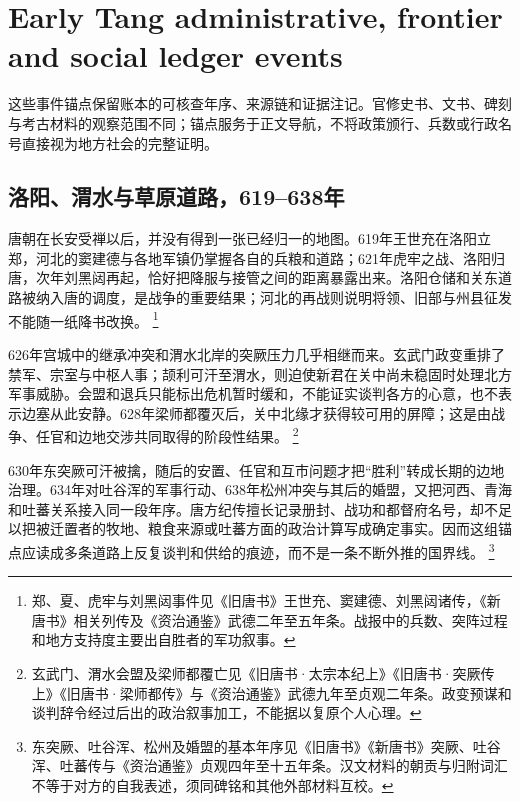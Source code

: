 \section{Early Tang administrative, frontier and social ledger events}
\label{sec:tang-event-anchors-batch-two}
这些事件锚点保留账本的可核查年序、来源链和证据注记。官修史书、文书、碑刻与考古材料的观察范围不同；锚点服务于正文导航，不将政策颁行、兵数或行政名号直接视为地方社会的完整证明。

\subsection{洛阳、渭水与草原道路，619--638年}

唐朝在长安受禅以后，并没有得到一张已经归一的地图。619年王世充在洛阳立郑，河北的窦建德与各地军镇仍掌握各自的兵粮和道路；621年虎牢之战、洛阳归唐，次年刘黑闼再起，恰好把降服与接管之间的距离暴露出来。洛阳仓储和关东道路被纳入唐的调度，是战争的重要结果；河北的再战则说明将领、旧部与州县征发不能随一纸降书改换。%
\footnote{郑、夏、虎牢与刘黑闼事件见《旧唐书》王世充、窦建德、刘黑闼诸传，《新唐书》相关列传及《资治通鉴》武德二年至五年条。战报中的兵数、突阵过程和地方支持度主要出自胜者的军功叙事。}

626年宫城中的继承冲突和渭水北岸的突厥压力几乎相继而来。玄武门政变重排了禁军、宗室与中枢人事；颉利可汗至渭水，则迫使新君在关中尚未稳固时处理北方军事威胁。会盟和退兵只能标出危机暂时缓和，不能证实谈判各方的心意，也不表示边塞从此安静。628年梁师都覆灭后，关中北缘才获得较可用的屏障；这是由战争、任官和边地交涉共同取得的阶段性结果。%
\footnote{玄武门、渭水会盟及梁师都覆亡见《旧唐书·太宗本纪上》《旧唐书·突厥传上》《旧唐书·梁师都传》与《资治通鉴》武德九年至贞观二年条。政变预谋和谈判辞令经过后出的政治叙事加工，不能据以复原个人心理。}

630年东突厥可汗被擒，随后的安置、任官和互市问题才把“胜利”转成长期的边地治理。634年对吐谷浑的军事行动、638年松州冲突与其后的婚盟，又把河西、青海和吐蕃关系接入同一段年序。唐方纪传擅长记录册封、战功和都督府名号，却不足以把被迁置者的牧地、粮食来源或吐蕃方面的政治计算写成确定事实。因而这组锚点应读成多条道路上反复谈判和供给的痕迹，而不是一条不断外推的国界线。%
\footnote{东突厥、吐谷浑、松州及婚盟的基本年序见《旧唐书》《新唐书》突厥、吐谷浑、吐蕃传与《资治通鉴》贞观四年至十五年条。汉文材料的朝贡与归附词汇不等于对方的自我表述，须同碑铭和其他外部材料互校。}

